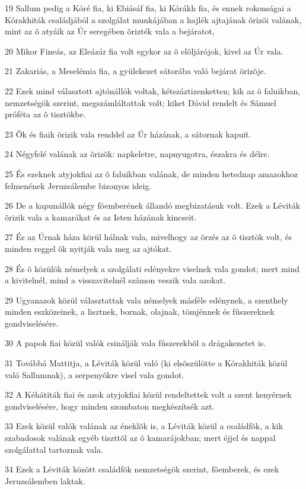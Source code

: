 \par 19 Sallum pedig a Kóré fia, ki Ebiásáf fia, ki Kórákh fia, és ennek rokonságai a Kórakhiták családjából a szolgálat munkájában a hajlék ajtajának õrizõi valának, mint az õ atyáik az Úr seregében õrizték vala a bejáratot,
\par 20 Mikor Fineás, az Eleázár fia volt egykor az õ elõljárójok, kivel az Úr vala.
\par 21 Zakariás, a Meselémia fia, a gyülekezet sátorába való bejárat õrizõje.
\par 22 Ezek mind választott ajtónállók voltak, kétszáztizenketten; kik az õ faluikban, nemzetségök szerint, megszámláltattak volt; kiket Dávid rendelt és Sámuel próféta az õ tisztökbe.
\par 23 Õk és fiaik õrizik vala renddel az Úr házának, a sátornak kapuit.
\par 24 Négyfelé valának az õrizõk: napkeletre, napnyugotra, északra és délre.
\par 25 És ezeknek atyjokfiai az õ faluikban valának, de minden hetednap amazokhoz felmenének Jeruzsálembe bizonyos ideig.
\par 26 De a kapunállók négy fõemberének állandó megbizatásuk volt. Ezek a Léviták õrizik vala a kamarákat és az Isten házának  kincseit.
\par 27 És az Úrnak háza körül hálnak vala, mivelhogy az õrzés az õ tisztök volt, és minden reggel õk nyitják vala meg az ajtókat.
\par 28 És õ közülök némelyek a szolgálati edényekre viselnek vala gondot; mert mind a kivitelnél, mind a visszavitelnél számon veszik vala azokat.
\par 29 Ugyanazok közül választattak vala némelyek másféle edénynek, a szenthely minden eszközeinek, a lisztnek, bornak, olajnak, tömjénnek és fûszereknek gondviselésére.
\par 30 A papok fiai közül valók csinálják vala fûszerekbõl a drágakenetet is.
\par 31 Továbbá Mattitja, a Léviták közül való (ki elsõszülötte a Kórakhiták közül való Sallumnak), a serpenyõkre visel vala gondot.
\par 32 A Kéhátiták fiai és azok atyjokfiai közül rendeltettek volt a szent kenyérnek gondviselésére, hogy minden szombaton megkészítsék azt.
\par 33 Ezek közül valók valának az éneklõk is, a Léviták közül a családfõk, a kik szabadosok valának egyéb tiszttõl az õ kamarájokban; mert éjjel és nappal szolgálattal tartoznak vala.
\par 34 Ezek a Léviták között családfõk nemzetségök szerint, fõemberek, és ezek Jeruzsálemben laktak.
